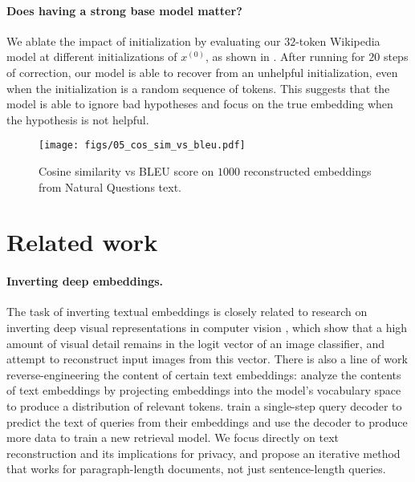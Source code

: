 \documentclass[11pt]{article}
\begin{document}
\paragraph{Does having a strong base model matter?}
We ablate the impact of initialization by evaluating our $32$-token Wikipedia model at different initializations of $x^{(0)}$, as shown in . After running for $20$ steps of correction, our model is able to recover from an unhelpful initialization, even when the initialization is a random sequence of tokens. This suggests that the model is able to ignore bad hypotheses and focus on the true embedding when the hypothesis is not helpful.



\begin{figure}[t]
    \centering
    \texttt{[image: figs/05\_cos\_sim\_vs\_bleu.pdf]}
    \caption{Cosine similarity vs BLEU score on $1000$ reconstructed embeddings from Natural Questions text.}
    \label{fig:05_cos_sim_vs_bleu}
\end{figure}

\section{Related work}

\paragraph{Inverting deep embeddings.} The task of inverting textual embeddings is closely related to research on inverting deep visual representations in computer vision \cite{mahendran2014UnderstandingDI,dosovitskiy2016inverting,teterwak2021understanding,bordes2021highfissl}, which show that a high amount of visual detail remains in the logit vector of an image classifier, and attempt to reconstruct input images from this vector. There is also a line of work reverse-engineering the content of certain text embeddings: \citet{ram2023token} analyze the contents of text embeddings by projecting embeddings into the model's vocabulary space to produce a distribution of relevant tokens. \citet{adolphs2022decoding} train a single-step query decoder to predict the text of queries from their embeddings and use the decoder to produce more data to train a new retrieval model. We focus directly on text reconstruction and its implications for privacy, and propose an iterative method that works for paragraph-length documents, not just sentence-length queries.
\end{document}

